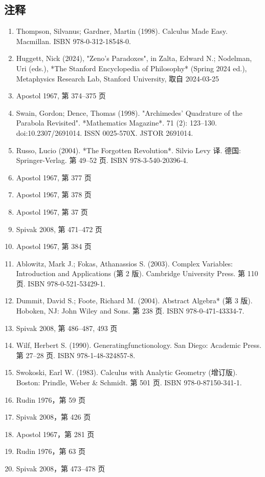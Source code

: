 \subsection{注释}
\begin{enumerate}
\item Thompson, Silvanus; Gardner, Martin (1998). Calculus Made Easy. Macmillan. ISBN 978-0-312-18548-0.
\item Huggett, Nick (2024), "Zeno's Paradoxes", in Zalta, Edward N.; Nodelman, Uri (eds.), *The Stanford Encyclopedia of Philosophy* (Spring 2024 ed.), Metaphysics Research Lab, Stanford University, 取自 2024-03-25
\item Apostol 1967, 第 374–375 页
\item Swain, Gordon; Dence, Thomas (1998). "Archimedes' Quadrature of the Parabola Revisited". *Mathematics Magazine*. 71 (2): 123–130. doi:10.2307/2691014. ISSN 0025-570X. JSTOR 2691014.
\item Russo, Lucio (2004). *The Forgotten Revolution*. Silvio Levy 译. 德国: Springer-Verlag. 第 49–52 页. ISBN 978-3-540-20396-4.
\item Apostol 1967, 第 377 页
\item Apostol 1967, 第 378 页
\item Apostol 1967, 第 37 页
\item Spivak 2008, 第 471–472 页
\item Apostol 1967, 第 384 页
\item Ablowitz, Mark J.; Fokas, Athanassios S. (2003). Complex Variables: Introduction and Applications (第 2 版). Cambridge University Press. 第 110 页. ISBN 978-0-521-53429-1.
\item Dummit, David S.; Foote, Richard M. (2004). Abstract Algebra* (第 3 版). Hoboken, NJ: John Wiley and Sons. 第 238 页. ISBN 978-0-471-43334-7.
\item Spivak 2008, 第 486–487, 493 页
\item Wilf, Herbert S. (1990). Generatingfunctionology. San Diego: Academic Press. 第 27–28 页. ISBN 978-1-48-324857-8.
\item Swokoski, Earl W. (1983). Calculus with Analytic Geometry (增订版). Boston: Prindle, Weber & Schmidt. 第 501 页. ISBN 978-0-87150-341-1.
\item Rudin 1976，第 59 页
\item Spivak 2008，第 426 页
\item Apostol 1967，第 281 页
\item Rudin 1976，第 63 页
\item Spivak 2008，第 473–478 页

\end{enumerate}

